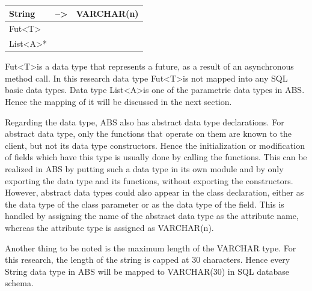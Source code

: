 \documentclass[runningheads,a4paper]{llncs}
\begin{document}
\begin{table}[]
\begin{tabular}{|l|l|l|}
		String                                                                                                                                       & --\textgreater                                                           & VARCHAR(n)                                                                                                                            \\ \hline
		Fut\textless T\textgreater*                                                                                                                   &                                                                          &                                                                                                                                       \\ \hline
		List\textless A\textgreater**                                                                                                                 &                                                                          &                                                                                                                                       \\ \hline
	\end{tabular}
\end{table}

Fut\textless T\textgreater is a data type that represents a future, as a result of an asynchronous method call. In this research data type Fut\textless T\textgreater is not mapped into any SQL basic data types. Data type List\textless A\textgreater is one of the parametric data types in ABS. Hence the mapping of it will be discussed in the next section.

Regarding the data type, ABS also has abstract data type declarations. For abstract data type, only the functions that operate on them are known to the client, but not its data type constructors. Hence the initialization or modification of fields which have this type is usually done by calling the functions. This can be realized in ABS by putting such a data type in its own module and by only exporting the data type and its functions, without exporting the constructors. However, abstract data types could also appear in the class declaration, either as the data type of the class parameter or as the data type of the field. This is handled by assigning the name of the abstract data type as the attribute name, whereas the attribute type is assigned as VARCHAR(n).

Another thing to be noted is the maximum length of the VARCHAR type. For this research, the length of the string is capped at 30 characters. Hence every String data type in ABS will be mapped to VARCHAR(30) in SQL database schema.
\end{document}
